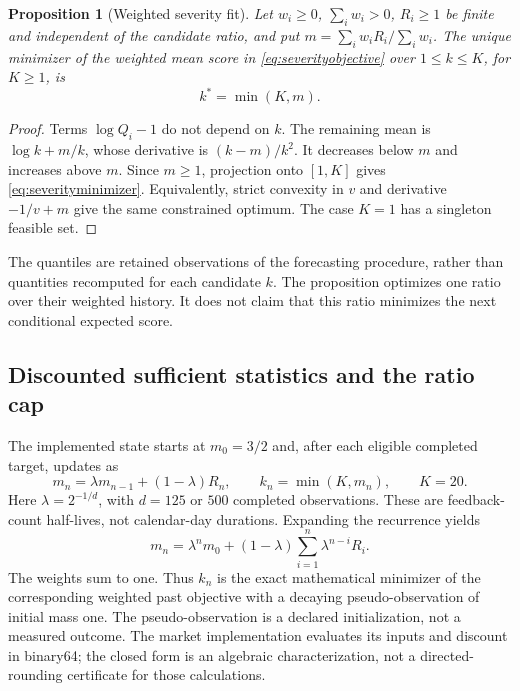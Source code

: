 \documentclass[11pt,a4paper]{article}
\newtheorem{proposition}[theorem]{Proposition}
\theoremstyle{definition}\newtheorem{definition}[theorem]{Definition}
\begin{document}
\begin{proposition}[Weighted severity fit]\label{prop:severityfit}
Let $w_i\ge0$, $\sum_iw_i>0$, $R_i\ge1$ be finite and independent of the candidate ratio, and put $m=\sum_iw_iR_i/\sum_iw_i$. The unique minimizer of the weighted mean score in \eqref{eq:severityobjective} over $1\le k\le K$, for $K\ge1$, is
\begin{equation}
 k^*=\min(K,m).
 \label{eq:severityminimizer}
\end{equation}
\end{proposition}
\begin{proof}
Terms $\log Q_i-1$ do not depend on $k$. The remaining mean is $\log k+m/k$, whose derivative is $(k-m)/k^2$. It decreases below $m$ and increases above $m$. Since $m\ge1$, projection onto $[1,K]$ gives \eqref{eq:severityminimizer}. Equivalently, strict convexity in $v$ and derivative $-1/v+m$ give the same constrained optimum. The case $K=1$ has a singleton feasible set.
\end{proof}
The quantiles are retained observations of the forecasting procedure, rather than quantities recomputed for each candidate $k$. The proposition optimizes one ratio over their weighted history. It does not claim that this ratio minimizes the next conditional expected score.

\subsection{Discounted sufficient statistics and the ratio cap}
The implemented state starts at $m_0=3/2$ and, after each eligible completed target, updates as
\begin{equation}
 m_n=\lambda m_{n-1}+(1-\lambda)R_n,
 \qquad k_n=\min(K,m_n),\qquad K=20.
 \label{eq:severityupdate}
\end{equation}
Here $\lambda=2^{-1/d}$, with $d=125$ or $500$ completed observations. These are feedback-count half-lives, not calendar-day durations. Expanding the recurrence yields
\begin{equation}
 m_n=\lambda^n m_0+
       (1-\lambda)\sum_{i=1}^n\lambda^{n-i}R_i.
 \label{eq:severityweights}
\end{equation}
The weights sum to one. Thus $k_n$ is the exact mathematical minimizer of the corresponding weighted past objective with a decaying pseudo-observation of initial mass one. The pseudo-observation is a declared initialization, not a measured outcome. The market implementation evaluates its inputs and discount in binary64; the closed form is an algebraic characterization, not a directed-rounding certificate for those calculations.
\end{document}

